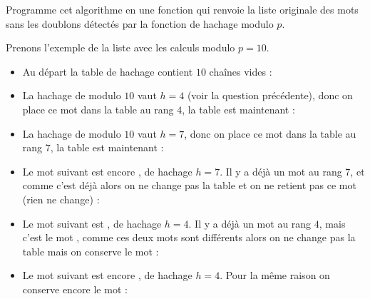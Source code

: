 \documentclass[11pt,class=report,crop=false]{standalone}
\begin{document}
\begin{activite}[Doublons]
\begin{enumerate}
\begin{itemize}
\begin{itemize}
  \end{itemize}  
\end{itemize}  

Programme cet algorithme en une fonction  qui renvoie la liste originale des mots sans les doublons détectés par la fonction de hachage modulo $p$.


\bigskip
Prenons l'exemple de la liste  avec les calculs modulo $p=10$.
\begin{itemize}
  \item Au départ la table de hachage contient $10$ chaînes vides :
 \mycenterline{\ci{['', '', '', '', '', '', '', '', '', '']}}
  \item La hachage de  modulo $10$ vaut $h=4$ (voir la question précédente), donc on place ce mot dans la table au rang $4$, la table est maintenant :
 
 \item La hachage de  modulo $10$ vaut $h=7$, donc on place ce mot dans la table au rang $7$, la table est maintenant : 
  
  \item Le mot suivant est encore , de hachage $h=7$. Il y a déjà un mot au rang $7$, et comme c'est déjà  alors on ne change pas la table et on ne retient pas ce mot (rien ne change) :   
 
 \item Le mot suivant est , de hachage $h=4$. Il y a déjà un mot au rang $4$, mais c'est le mot , comme ces deux mots sont différents alors on ne change pas la table mais on conserve le mot  :    
 
  \item Le mot suivant est encore , de hachage $h=4$. Pour la même raison on conserve encore le mot  :    
\end{itemize} 
 

\end{enumerate}
\end{activite}
\end{document}
